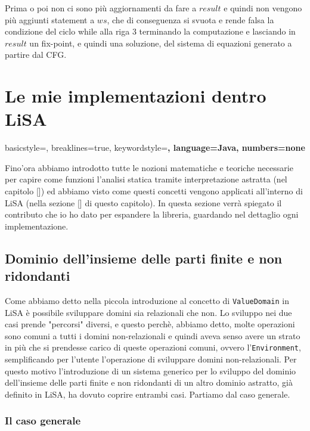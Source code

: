 Prima o poi non ci sono più aggiornamenti da fare a \(result\) e quindi non vengono più aggiunti statement a \(ws\), che di conseguenza si svuota e rende falsa la condizione del ciclo while alla riga 3 terminando la computazione e lasciando in \(result\) un fix-point, e quindi una soluzione, del sistema di equazioni generato a partire dal CFG.

\section{Le mie implementazioni dentro LiSA}

\lstset
    {
    basicstyle=\footnotesize\ttfamily,
    breaklines=true,
    keywordstyle=\color{keywordsColor}\bfseries,
    language=Java, 
    numbers=none
    }

Fino'ora abbiamo introdotto tutte le nozioni matematiche e teoriche necessarie per capire come funzioni l'analisi statica tramite interpretazione astratta (nel capitolo []) ed abbiamo visto come questi concetti vengono applicati all'interno di LiSA (nella sezione [] di questo capitolo). In questa sezione verrà spiegato il contributo che io ho dato per espandere la libreria, guardando nel dettaglio ogni implementazione. 

\subsection{Dominio dell'insieme delle parti finite e non ridondanti}

Come abbiamo detto nella piccola introduzione al concetto di \texttt{ValueDomain} in LiSA è possibile sviluppare domini sia relazionali che non. Lo sviluppo nei due casi prende "percorsi" diversi, e questo perchè, abbiamo detto, molte operazioni sono comuni a tutti i domini non-relazionali e quindi aveva senso avere un strato in più che si prendesse carico di queste operazioni comuni, ovvero l'\texttt{Environment}, semplificando per l'utente l'operazione di sviluppare domini non-relazionali. Per questo motivo l'introduzione di un sistema generico per lo sviluppo del dominio dell'insieme delle parti finite e non ridondanti di un altro dominio astratto, già definito in LiSA, ha dovuto coprire entrambi casi. Partiamo dal caso generale. 

\subsubsection{Il caso generale}

